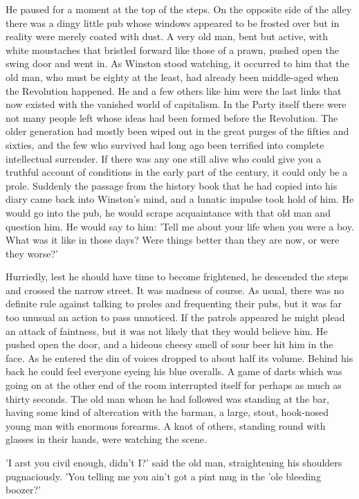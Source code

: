 \documentclass{article}
\begin{document}
He paused for a moment at the top of the steps. On the opposite side of
the alley there was a dingy little pub whose windows appeared to be frosted
over but in reality were merely coated with dust. A very old man, bent but
active, with white moustaches that bristled forward like those of a prawn,
pushed open the swing door and went in. As Winston stood watching, it
occurred to him that the old man, who must be eighty at the least, had
already been middle-aged when the Revolution happened. He and a few others
like him were the last links that now existed with the vanished world of
capitalism. In the Party itself there were not many people left whose ideas
had been formed before the Revolution. The older generation had mostly
been wiped out in the great purges of the fifties and sixties, and the few
who survived had long ago been terrified into complete intellectual
surrender. If there was any one still alive who could give you a truthful
account of conditions in the early part of the century, it could only be a
prole. Suddenly the passage from the history book that he had copied into
his diary came back into Winston's mind, and a lunatic impulse took hold
of him. He would go into the pub, he would scrape acquaintance with that
old man and question him. He would say to him: 'Tell me about your life
when you were a boy. What was it like in those days? Were things better
than they are now, or were they worse?'

Hurriedly, lest he should have time to become frightened, he descended the
steps and crossed the narrow street. It was madness of course. As usual,
there was no definite rule against talking to proles and frequenting their
pubs, but it was far too unusual an action to pass unnoticed. If the
patrols appeared he might plead an attack of faintness, but it was not
likely that they would believe him. He pushed open the door, and a hideous
cheesy smell of sour beer hit him in the face. As he entered the din of
voices dropped to about half its volume. Behind his back he could feel
everyone eyeing his blue overalls. A game of darts which was going on at
the other end of the room interrupted itself for perhaps as much as thirty
seconds. The old man whom he had followed was standing at the bar, having
some kind of altercation with the barman, a large, stout, hook-nosed young
man with enormous forearms. A knot of others, standing round with glasses
in their hands, were watching the scene.

'I arst you civil enough, didn't I?' said the old man, straightening his
shoulders pugnaciously. 'You telling me you ain't got a pint mug in the
'ole bleeding boozer?'
\end{document}
